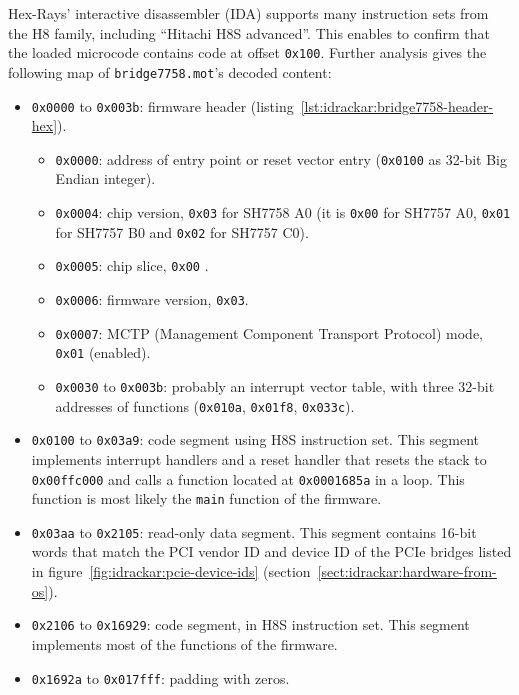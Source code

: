 Hex-Rays' interactive disassembler (IDA) supports many instruction sets from the H8 family, including ``Hitachi H8S advanced''.
This enables to confirm that the loaded microcode contains code at offset \texttt{0x100}.
Further analysis gives the following map of \texttt{bridge7758.mot}'s decoded content:
\begin{itemize}
  \item \texttt{0x0000} to \texttt{0x003b}: firmware header (listing~\ref{lst:idrackar:bridge7758-header-hex}).
    \begin{itemize}
      \item \texttt{0x0000}: address of entry point or reset vector entry (\texttt{0x0100} as 32-bit Big Endian integer).
      \item \texttt{0x0004}: chip version, \texttt{0x03} for SH7758 A0 (it is \texttt{0x00} for SH7757 A0, \texttt{0x01} for SH7757 B0 and \texttt{0x02} for SH7757 C0).
      \item \texttt{0x0005}: chip slice, \texttt{0x00} .
      \item \texttt{0x0006}: firmware version, \texttt{0x03}.
      \item \texttt{0x0007}: MCTP (Management Component Transport Protocol) mode, \texttt{0x01} (enabled).
      \item \texttt{0x0030} to \texttt{0x003b}: probably an interrupt vector table, with three 32-bit addresses of functions (\texttt{0x010a}, \texttt{0x01f8}, \texttt{0x033c}).
    \end{itemize}
  \item \texttt{0x0100} to \texttt{0x03a9}: code segment using H8S instruction set.
    This segment implements interrupt handlers and a reset handler that resets the stack to \texttt{0x00ffc000} and calls a function located at \texttt{0x0001685a} in a loop.
    This function is most likely the \texttt{main} function of the firmware.
  \item \texttt{0x03aa} to \texttt{0x2105}: read-only data segment.
    This segment contains 16-bit words that match the PCI vendor ID and device ID of the PCIe bridges listed in figure~\ref{fig:idrackar:pcie-device-ids} (section~\ref{sect:idrackar:hardware-from-os}).
  \item \texttt{0x2106} to \texttt{0x16929}: code segment, in H8S instruction set.
    This segment implements most of the functions of the firmware.
  \item \texttt{0x1692a} to \texttt{0x017fff}: padding with zeros.
\end{itemize}

